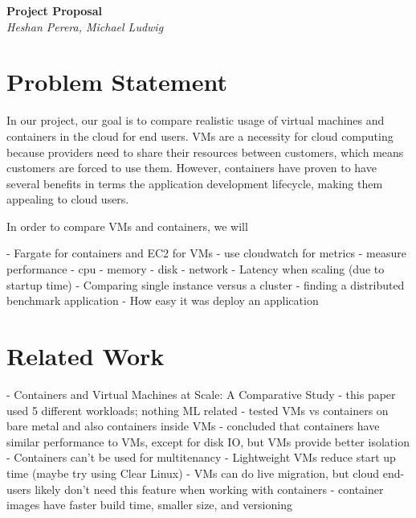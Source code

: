 \documentclass[11pt]{article}
\begin{document}
\renewcommand{\headrulewidth}{0pt} 
\renewcommand{\footrulewidth}{0pt} 
\pagestyle{fancy}
\cfoot{}
\lhead{}
\rhead{}
\lfoot{\itshape\textcolor{gray}{CS525T Cloud Computing Paper Review}}

\begin{center}
{\LARGE \bf Project Proposal} \\
{\normalsize \emph{Heshan Perera, Michael Ludwig}}\\

\end{center}

\section{Problem Statement}

In our project, our goal is to compare realistic usage of virtual machines and containers in the cloud for end users. VMs are a necessity for cloud computing because providers need to share their resources between customers, which means customers are forced to use them. However, containers have proven to have several benefits in terms the application development lifecycle, making them appealing to cloud users.

In order to compare VMs and containers, we will 

- Fargate for containers and EC2 for VMs
- use cloudwatch for metrics
- measure performance
  - cpu
  - memory
  - disk
  - network
- Latency when scaling (due to startup time)
- Comparing single instance versus a cluster
  - finding a distributed benchmark application
- How easy it was deploy an application

\section{Related Work}


- Containers and Virtual Machines at Scale: A Comparative Study
  - this paper used 5 different workloads; nothing ML related
  - tested VMs vs containers on bare metal and also containers inside VMs
    - concluded that containers have similar performance to VMs, except for disk IO, but VMs provide better isolation
  - Containers can't be used for multitenancy
  - Lightweight VMs reduce start up time (maybe try using Clear Linux)
  - VMs can do live migration, but cloud end-users likely don't need this feature when working with containers
  - container images have faster build time, smaller size, and versioning
\end{document}
